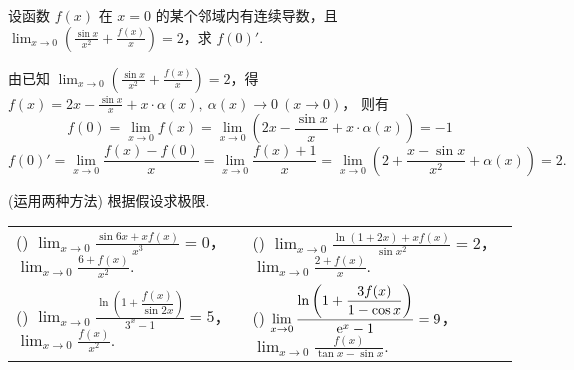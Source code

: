 \begin{example}
    设函数 $f(x)$ 在 $x=0$ 的某个邻域内有连续导数，且 $\displaystyle\lim_{x\to0}\left(\frac{\sin x}{x^2}+\frac{f(x)}{x}\right)=2$，求 $f(0)'.$
\end{example}
\begin{solution}
    由已知 $\displaystyle\lim_{x\to0}\left(\frac{\sin x}{x^2}+\frac{f(x)}{x}\right)=2$，得
    $\displaystyle f(x)=2x-\frac{\sin x}{x}+x\cdot\alpha(x),~\alpha(x)\to0~ (x\to0)$，
    则有 $$f(0)=\lim_{x\to0}f(x)=\lim_{x\to0}\left(2x-\frac{\sin x}{x}+x\cdot \alpha(x)\right)=-1$$
    $$f(0)'=\lim_{x\to0}\frac{f(x)-f(0)}{x}=\lim_{x\to0}\frac{f(x)+1}{x}=\lim_{x\to0}\left(2+\frac{x-\sin x}{x^2}+\alpha(x)\right)=2.$$
\end{solution}
\begin{example}
    (运用两种方法) 根据假设求极限.
    \setcounter{magicrownumbers}{0}
    \begin{table}[H]
        \centering
        \begin{tabular}{l | l}
            (\rownumber{}) $\displaystyle\lim_{x\to0}\frac{\sin 6x+xf(x)}{x^3}=0$，$\displaystyle\lim_{x\to0}\frac{6+f(x)}{x^2}.$                           & (\rownumber{}) $\displaystyle\lim_{x\to0}\frac{\ln(1+2x)+xf(x)}{\sin x^2}=2$，$\displaystyle\lim_{x\to0}\frac{2+f(x)}{x}.$                                    \\
            (\rownumber{}) $\displaystyle\lim_{x\to0}\frac{\ln\left(1+\dfrac{f(x)}{\sin 2x}\right)}{3^x-1}=5$，$\displaystyle\lim_{x\to0}\frac{f(x)}{x^2}.$ & (\rownumber{}) $\displaystyle\lim_{x\to0}\frac{\ln\left(1+\dfrac{3f(x)}{1-\cos x}\right)}{\mathrm{e} ^x-1}=9$，$\displaystyle\lim_{x\to0}\frac{f(x)}{\tan x-\sin x}.$
        \end{tabular}
    \end{table}
\end{example}
